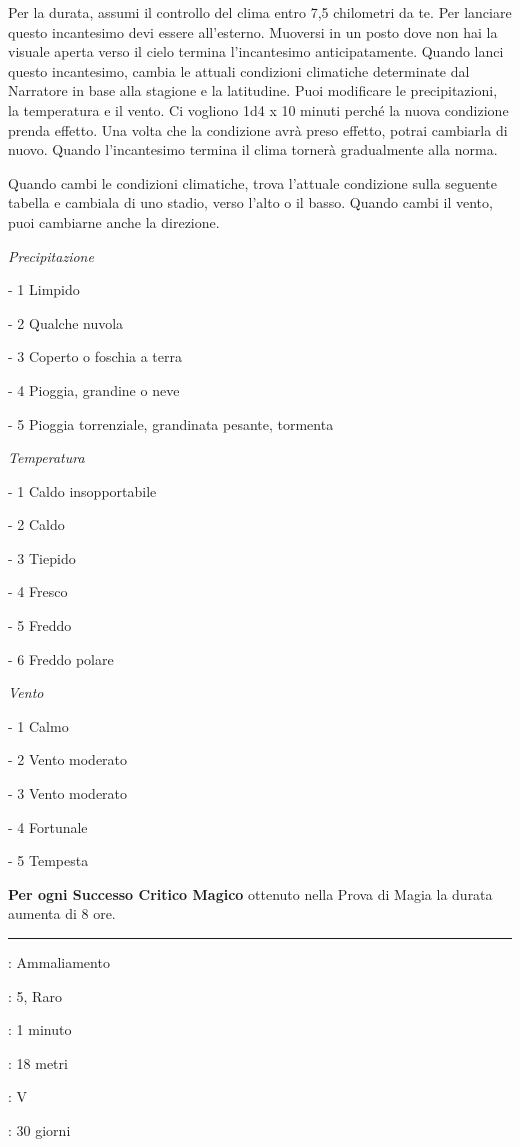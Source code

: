 \begin{multicols}{2}
Per la durata, assumi il controllo del clima entro 7,5 chilometri da te. Per lanciare questo incantesimo devi essere all'esterno. Muoversi in un posto dove non hai la visuale aperta verso il cielo termina l'incantesimo anticipatamente. Quando lanci questo incantesimo, cambia le attuali condizioni climatiche determinate dal Narratore in base alla stagione e la latitudine. Puoi modificare le precipitazioni, la temperatura e il vento. Ci vogliono 1d4 x 10 minuti perché la nuova condizione prenda effetto. Una volta che la condizione avrà preso effetto, potrai cambiarla di nuovo. Quando l'incantesimo termina il clima tornerà gradualmente alla norma.

\medskip

Quando cambi le condizioni climatiche, trova l'attuale condizione sulla seguente tabella e cambiala di uno stadio, verso l'alto o il basso. Quando cambi il vento, puoi cambiarne anche la direzione.

\medskip

\emph{Precipitazione}

- 1 Limpido

- 2 Qualche nuvola

- 3 Coperto o foschia a terra

- 4 Pioggia, grandine o neve

- 5 Pioggia torrenziale, grandinata pesante, tormenta

\medskip

\emph{Temperatura}

- 1 Caldo insopportabile

- 2 Caldo

- 3 Tiepido

- 4 Fresco

- 5 Freddo

- 6 Freddo polare

\medskip

\emph{Vento}

- 1 Calmo

- 2 Vento moderato

- 3 Vento moderato

- 4 Fortunale

- 5 Tempesta

\medskip

\textbf{Per ogni Successo Critico Magico} ottenuto nella Prova di Magia la durata aumenta di 8 ore.

\smallskip\noindent\rule{\linewidth}{2pt} \hypertarget{Costrizione}{}\medskip{}
\noindent
\begin{description}[noitemsep, topsep=0pt, parsep=0pt, partopsep=0pt, leftmargin=0cm, labelwidth=2.8cm]
	\item[\textbf{Lista di Magia}]: Ammaliamento
	\item[\textbf{Livello}]: 5, Raro
	\item[\textbf{T. di Lancio}]: 1 minuto
	\item[\textbf{Gittata}]: 18 metri
	\item[\textbf{Componenti}]: V
	\item[\textbf{Durata}]: 30 giorni
\end{description}


\end{multicols}
